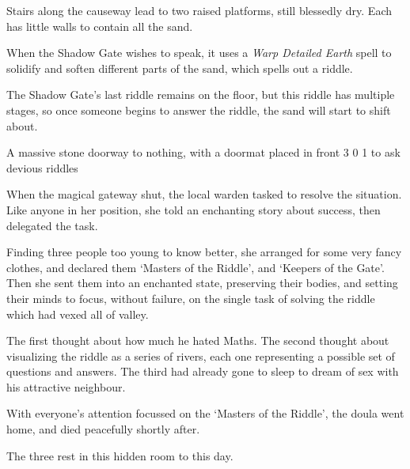 
Stairs along the causeway lead to two raised platforms, still blessedly dry.
Each has little walls to contain all the sand.

When the Shadow Gate wishes to speak, it uses a \textit{Warp Detailed Earth} spell to solidify and soften different parts of the sand, which spells out a riddle.

The Shadow Gate's last riddle remains on the floor, but this riddle has multiple stages, so once someone begins to answer the riddle, the sand will start to shift about.

  {A massive stone doorway to nothing, with a doormat placed in front}%
  {3}%
  {0}%
  {1}%
  {to ask devious riddles}%
  {
    \setcounter{Fire}{3}
    \setcounter{Earth}{2}
    \setcounter{Fate}{1}
    \setcounter{Water}{1}
    \setcounter{Academics}{2}
    \setcounter{Wyldcrafting}{1}
  }%

\showStdSpells[
  \setcounter{diceNo}{0}
]


\begin{exampletext}
  When the magical gateway shut, the local \gls{warden} tasked  to resolve the situation.
  Like anyone in her position, she told an enchanting story about success, then delegated the task.

  Finding three people too young to know better, she arranged for some very fancy clothes, and declared them `Masters of the Riddle', and `Keepers of the Gate'.
  Then she sent them into an enchanted state, preserving their bodies, and setting their minds to focus, without failure, on the single task of solving the riddle which had vexed all of \gls{valley}.

  The first thought about how much he hated Maths.
  The second thought about visualizing the riddle as a series of rivers, each one representing a possible set of questions and answers.
  The third had already gone to sleep to dream of sex with his attractive neighbour.

  With everyone's attention focussed on the `Masters of the Riddle', the \gls{doula} went home, and died peacefully shortly after.

  The three rest in this hidden room to this day.
\end{exampletext}


